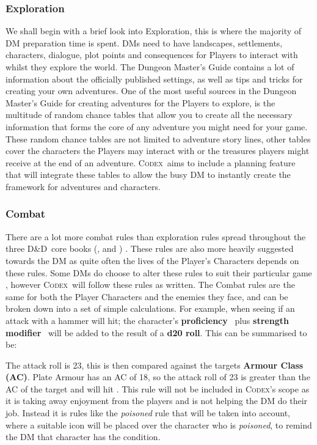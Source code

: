 \documentclass[review]{cmpreport}
\newcommand{\dnd}{D\&D}
\newcommand{\Codex}{\textsc{Codex}}
\begin{document}
	\subsubsection{Exploration}
	We shall begin with a brief look into Exploration, this is where the majority of DM preparation time is spent. DMs need to have landscapes, settlements, characters, dialogue, plot points and consequences for Players to interact with whilst they explore the world. The Dungeon Master's Guide \citep{DMGuide} contains a lot of information about the officially published settings, as well as tips and tricks for creating your own adventures. One of the most useful sources in the Dungeon Master's Guide for creating adventures for the Players to explore, is the multitude of random chance tables that allow you to create all the necessary information that forms the core of any adventure you might need for your game. These random chance tables are not limited to adventure story lines, other tables cover the characters the Players may interact with or the treasures players might receive at the end of an adventure. \Codex \ aims to include a planning feature that will integrate these tables to allow the busy DM to instantly create the framework for adventures and characters. 
	
	\subsubsection{Combat}
	There are a lot more combat rules than exploration rules spread throughout the three \dnd \ core books (\cite{DMGuide}, \cite{MonsterManual} and \cite{PlayerHandbook}) . These rules are also more heavily suggested towards the DM as quite often the lives of the Player's Characters depends on these rules. Some DMs do choose to alter these rules to suit their particular game \citep{Personal}, however \Codex \ will follow these rules as written. The Combat rules are the same for both the Player Characters and the enemies they face, and can be broken down into a set of simple calculations. For example, when seeing if an attack with a hammer will hit; the character's \textbf{proficiency} \ plus \textbf{strength modifier} \ will be added to the result of a \textbf{d20 roll}. This can be summarised to be:

	The attack roll is 23, this is then compared against the targets \textbf{Armour Class (AC)}. Plate Armour has an AC of 18, so the attack roll of 23 is greater than the AC of the target and will hit \citep{PlayerHandbook}. This rule will not be included in \Codex's scope as it is taking away enjoyment from the players and is not helping the DM do their job. Instead it is rules like the \emph{poisoned} rule that will be taken into account, where a suitable icon will be placed over the character who is \emph{poisoned}, to remind the DM that  character has the condition.
	
\end{document}
